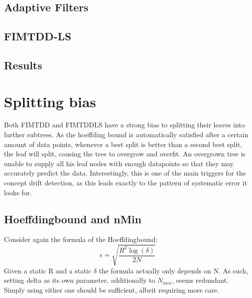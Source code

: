 \documentclass[a4paper,pt12]{article}
\begin{document}
\subsection{Adaptive Filters}

\subsection{FIMTDD-LS}

\subsection{Results}

\section{Splitting bias}
Both FIMTDD and FIMTDDLS have a strong bias to splitting their leaves into further subtrees. As the hoeffding bound is automatically satisfied after a certain amount of data points, whenever a best split is better than a second best split, the leaf will split, causing the tree to overgrow and overfit. An overgrown tree is unable to supply all his leaf nodes with enough datapoints so that they may accurately predict the data.
Interestingly, this is one of the main triggers for the concept drift detection, as this leads exactly to the pattern of systematic error it looks for.
 
\subsection{Hoeffdingbound and nMin}
Consider again the formula of the Hoeffdingbound:\newline
$$\epsilon = \sqrt{\frac{R^2\log(\delta)}{2N}}$$
\newline
Given a static R and a static $\delta$ the formula actually only depends on N. As such, setting delta as its own parameter, additionally to $N_{min}$, seems redundant. Simply using either one should be sufficient, albeit requiring more care.
\end{document}
